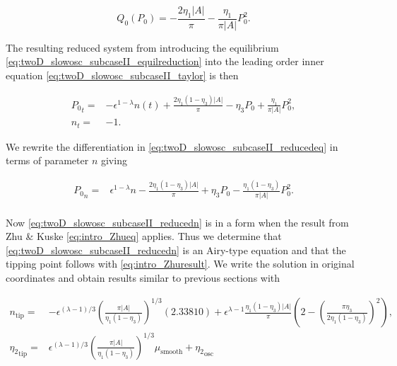 \begin{equation}\label{eq:twoD_slowosc_subcaseII_equilreduction}
{Q_0}(P_0) = -\frac{2\eta_1|A|}{\pi}-\frac{\eta_1}{\pi|A|}P_0^2.
\end{equation}

The resulting reduced system from introducing the equilibrium \eqref{eq:twoD_slowosc_subcaseII_equilreduction} into the leading order inner equation \eqref{eq:twoD_slowosc_subcaseII_taylor} is then

\begin{equation}\label{eq:twoD_slowosc_subcaseII_reducedeq}
\begin{aligned}
{P_0}_t =& -\epsilon^{1-\lambda}n(t)+\frac{2\eta_1(1-\eta_3)|A|}{\pi}-\eta_3P_0+\frac{\eta_1}{\pi|A|}P_0^2,\\
n_t=&-1.
\end{aligned}
\end{equation}

We rewrite the differentiation in \eqref{eq:twoD_slowosc_subcaseII_reducedeq} in terms of parameter $n$ giving 

\begin{equation} \label{eq:twoD_slowosc_subcaseII_reducedn}
\begin{aligned}
{P_0}_n =& \epsilon^{1-\lambda} n -\frac{2\eta_1(1-\eta_3)|A|}{\pi}+\eta_3 P_0-\frac{\eta_1(1-\eta_3)}{\pi|A|}P_0^2.\\
\end{aligned}
\end{equation}

Now \eqref{eq:twoD_slowosc_subcaseII_reducedn} is in a form when the result from Zhu \& Kuske \eqref{eq:intro_Zhueq} applies. Thus we determine that \eqref{eq:twoD_slowosc_subcaseII_reducedn} is an Airy-type equation and that the tipping point follows with \eqref{eq:intro_Zhuresult}. We write the solution in original coordinates and obtain results similar to previous sections with

\begin{equation}\label{eq:twoD_slowosc_subcaseII_tipping}
\begin{aligned}
n_{\text{tip}} =& -\epsilon^{(\lambda-1)/3}\left(\frac{\pi|A|}{\eta_1(1-\eta_3)}\right)^{1/3}(2.33810)+\epsilon^{\lambda-1}\frac{\eta_1(1-\eta_3)|A|}{\pi}\left(2-\left(\frac{\pi\eta_3}{2\eta_1(1-\eta_3)}\right)^2\right),\\
{\eta_2}_{\text{tip}} =& \epsilon^{(\lambda-1)/3}\left(\frac{\pi|A|}{\eta_1(1-\eta_3)}\right)^{1/3}\mu_{\text{smooth}}+{\eta_2}_{\text{osc}}
\end{aligned}
\end{equation}

